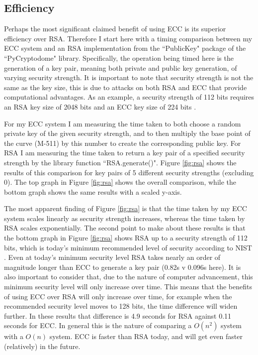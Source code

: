 \documentclass[12pt,a4paper]{article}
\begin{document}
\subsection{Efficiency} \noindent \label{Efficiency}
Perhaps the most significant claimed benefit of using ECC is its superior efficiency over RSA. 
Therefore I start here with a timing comparison between my ECC system and an RSA implementation 
from the ``PublicKey" package of the ``PyCryptodome" library. 
Specifically, the operation being timed here is the generation of a key pair, meaning both private and public key generation, 
of varying security strength. 
It is important to note that security strength is not the same as the key size, this is due to attacks on both RSA and ECC that provide computational advantages. 
As an example, a security strength of 112 bits requires an RSA key size of 2048 bits and an ECC key size of 224 bits \cite[p54-55]{barker2020recommendation}. 

For my ECC system I am measuring the time taken to both choose a random private key of the given security strength, 
and to then multiply the base point of the curve (M-511) by this number to create the corresponding public key. 
For RSA I am measuring the time taken to return a key pair of a specified security strength by the library function ``RSA.generate()". 
Figure \ref{fig:rsa} shows the results of this comparison for key pairs of 5 different security strengths (excluding 0). 
The top graph in Figure \ref{fig:rsa} shows the overall comparison, while the bottom graph shows the same results with a scaled y-axis. 

The most apparent finding of Figure \ref{fig:rsa} is that the time taken by my ECC system scales linearly as security strength increases, 
whereas the time taken by RSA scales exponentially. 
The second point to make about these results is that the bottom graph in Figure \ref{fig:rsa} shows RSA up to a security strength of 112 bits, 
which is today's minimum recommended level of security according to NIST \cite[p54-55]{barker2020recommendation}. 
Even at today's minimum security level RSA takes nearly an order of magnitude longer than ECC to generate a key pair (0.82s v 0.096s here). 
It is also important to consider that, due to the nature of computer advancement, this minimum security level will only increase over time. 
This means that the benefits of using ECC over RSA will only increase over time, 
for example when the recommended security level moves to 128 bits, the time difference will widen further. 
In these results that difference is 4.9 seconds for RSA against 0.11 seconds for ECC. 
In general this is the nature of comparing a $O(n^2)$ system with a $O(n)$ system. 
ECC is faster than RSA today, and will get even faster (relatively) in the future. 
\end{document}
